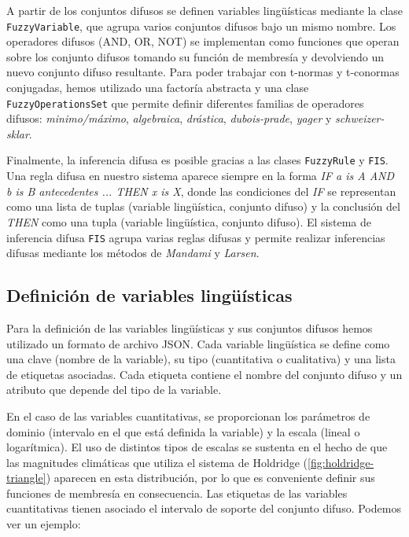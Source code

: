 \documentclass[11pt,a4paper]{article}
\begin{document}
A partir de los conjuntos difusos se definen variables lingüísticas mediante la clase \texttt{FuzzyVariable}, que agrupa varios conjuntos difusos bajo un mismo nombre.
Los operadores difusos (AND, OR, NOT) se implementan como funciones que operan sobre los conjunto difusos tomando su función de membresía y devolviendo un nuevo conjunto difuso resultante.
Para poder trabajar con t-normas y t-conormas conjugadas, hemos utilizado una factoría abstracta y una clase \texttt{FuzzyOperationsSet} que permite definir diferentes familias de operadores difusos:
\textit{minimo/máximo}, \textit{algebraica}, \textit{drástica}, \textit{dubois-prade}, \textit{yager} y \textit{schweizer-sklar}.

Finalmente, la inferencia difusa es posible gracias a las clases \texttt{FuzzyRule} y \texttt{FIS}.
Una regla difusa en nuestro sistema aparece siempre en la forma \textit{IF a is A AND b is B antecedentes ... THEN x is X}, donde las condiciones del \textit{IF} se representan como una lista de tuplas (variable lingüística, conjunto difuso)
y la conclusión del \textit{THEN} como una tupla (variable lingüística, conjunto difuso). El sistema de inferencia difusa \texttt{FIS} agrupa varias reglas difusas y permite realizar inferencias difusas mediante los métodos de \textit{Mandami} y \textit{Larsen}.

\clearpage

\subsection{Definición de variables lingüísticas}

Para la definición de las variables lingüísticas y sus conjuntos difusos hemos utilizado un formato de archivo JSON.
Cada variable lingüística se define como una clave (nombre de la variable), su tipo (cuantitativa o cualitativa) y una lista de etiquetas asociadas.
Cada etiqueta contiene el nombre del conjunto difuso y un atributo que depende del tipo de la variable. 

En el caso de las variables cuantitativas, se proporcionan los parámetros de dominio (intervalo en el que está definida la variable) y
la escala (lineal o logarítmica). El uso de distintos tipos de escalas se sustenta en el hecho de que las magnitudes climáticas que utiliza el 
sistema de Holdridge (\ref{fig:holdridge-triangle}) aparecen en esta distribución, por lo que es conveniente definir sus funciones de membresía en consecuencia.
Las etiquetas de las variables cuantitativas tienen asociado el intervalo de soporte del conjunto difuso. Podemos ver un ejemplo:
\end{document}
